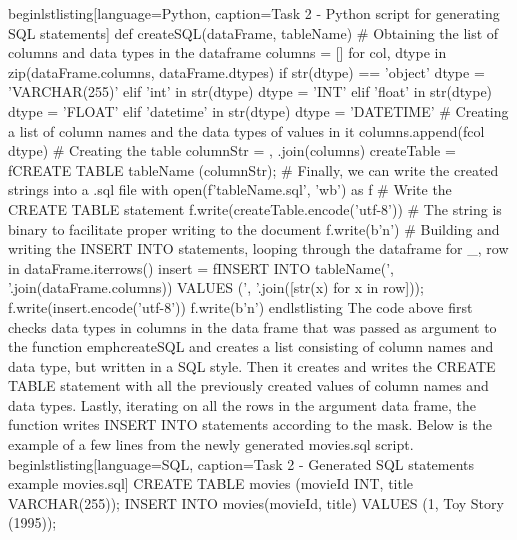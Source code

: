 begin{lstlisting}[language=Python, caption=Task 2 - Python script for generating SQL statements]
               def createSQL(dataFrame, tableName)
                # Obtaining the list of columns and data types  in the dataframe
                columns = []
                for col, dtype in zip(dataFrame.columns, dataFrame.dtypes)
                        if str(dtype) == 'object'
                                dtype = 'VARCHAR(255)'
                        elif 'int' in str(dtype)
                                dtype = 'INT'
                        elif 'float' in str(dtype)
                                dtype = 'FLOAT'
                        elif 'datetime' in str(dtype)
                                dtype = 'DATETIME'
                        # Creating a list of column names and the data types of values in it
                        columns.append(f{col} {dtype})
                # Creating the table
                columnStr = , .join(columns)
                createTable = fCREATE TABLE {tableName} ({columnStr});
                #  Finally, we can write the created strings into a .sql file
                with open(f'{tableName}.sql', 'wb') as f
                        # Write the CREATE TABLE statement
                        f.write(createTable.encode('utf-8'))
                        # The string is binary to facilitate proper writing to the document
                        f.write(b'n')
                        # Building and writing the INSERT INTO statements, looping  through the dataframe
                        for _, row in dataFrame.iterrows()
                                insert = fINSERT INTO {tableName}({', '.join(dataFrame.columns)}) VALUES ({', '.join([str(x) for x in row])});
                                f.write(insert.encode('utf-8'))
                                f.write(b'n')
end{lstlisting}
The code above first checks data types in columns in the data frame that was passed as argument to the function emph{createSQL} and creates a list consisting of column names and data type, but written in a SQL style. Then it creates and writes the CREATE TABLE statement with all the previously created values of column names and data types. Lastly, iterating on all the rows in the argument data frame, the function writes INSERT INTO statements according to the mask.
Below is the example of a few lines from the newly generated movies.sql script. 
begin{lstlisting}[language=SQL, caption=Task 2 - Generated SQL statements example movies.sql]
       CREATE TABLE movies (movieId INT, title VARCHAR(255));
INSERT INTO movies(movieId, title) VALUES (1, Toy Story (1995));
